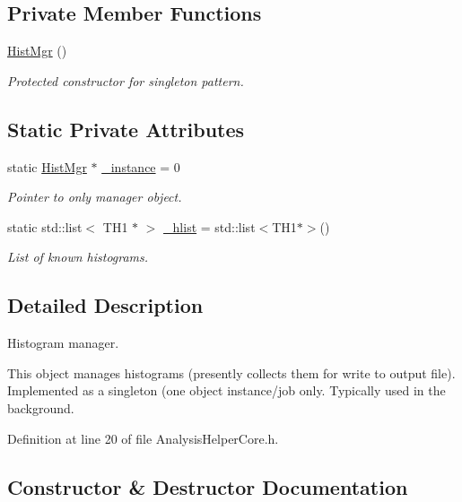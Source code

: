 \subsection*{Private Member Functions}
\begin{DoxyCompactItemize}
\item 
\hyperlink{classHistUtils_1_1HistMgr_a1ab05ff224b8260bab8e9f2e4c9c9b12}{Hist\+Mgr} ()
\begin{DoxyCompactList}\small\item\em Protected constructor for singleton pattern. \end{DoxyCompactList}\end{DoxyCompactItemize}
\subsection*{Static Private Attributes}
\begin{DoxyCompactItemize}
\item 
static \hyperlink{classHistUtils_1_1HistMgr}{Hist\+Mgr} $\ast$ \hyperlink{classHistUtils_1_1HistMgr_a9941e8757f5e3dabfc24422822857fe6}{\+\_\+instance} = 0
\begin{DoxyCompactList}\small\item\em Pointer to only manager object. \end{DoxyCompactList}\item 
static std\+::list$<$ T\+H1 $\ast$ $>$ \hyperlink{classHistUtils_1_1HistMgr_a2f35b5aff01c50080e7ea59309f69842}{\+\_\+hlist} = std\+::list$<$T\+H1$\ast$$>$()
\begin{DoxyCompactList}\small\item\em List of known histograms. \end{DoxyCompactList}\end{DoxyCompactItemize}


\subsection{Detailed Description}
Histogram manager. 

This object manages histograms (presently collects them for write to output file). Implemented as a singleton (one object instance/job only. Typically used in the background. 

Definition at line 20 of file Analysis\+Helper\+Core.\+h.



\subsection{Constructor \& Destructor Documentation}
